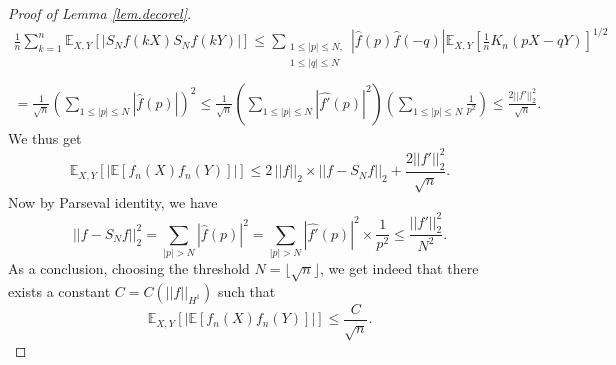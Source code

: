 \documentclass[10pt,a4paper]{amsart}
\begin{document}
\begin{proof}[Proof of Lemma \ref{lem.decorel}]
\[
\begin{array}{l}
\displaystyle{\frac{1}{n}\sum_{k=1}^{n} \mathbb E_{X,Y}\left[|S_N f(kX) S_N f(kY)|\right]}  \displaystyle{\leq \sum_{\substack{1\leq |p|\leq N, \\ 1\leq |q|\leq N}}|\widehat{f}(p)\widehat{f}(-q)|\mathbb E_{X,Y}\left[\frac{1}{n}K_n(pX-qY)\right]^{1/2}}\\
\\
 =\displaystyle{ \frac{1}{\sqrt{n}} \left( \sum_{1\leq |p|\leq N}|\widehat{f}(p)|\right)^2 \leq \frac{1}{\sqrt{n}} \left( \sum_{1\leq |p|\leq N}|\widehat{f'}(p)|^2\right)\left( \sum_{1\leq |p|\leq N}\frac{1}{p^2}\right)\leq \frac{2 ||f'||_2^2}{\sqrt{n}}}.
\end{array}
\]
We thus get 
\[
\mathbb E_{X,Y} \left[ \left|\mathbb E[f_n(X)f_n(Y)] \right|\right] \leq 2\, ||f||_2 \times ||f-S_Nf ||_2 + \frac{2 ||f'||_2^2}{\sqrt{n}}.
\]
Now by Parseval identity, we have 
\[
||f-S_Nf ||_2^2 = \sum_{|p|>N}|\widehat{f}(p)|^2 =  \sum_{|p|>N}|\widehat{f'}(p)|^2 \times \frac{1}{p^2} \leq \frac{||f'||_2^2}{N^2}.
\]
As a conclusion, choosing the threshold $N=\lfloor\sqrt{n}\rfloor$, we get indeed that there exists a constant $C=C(||f||_{H^1})$ such that 
\[
\mathbb E_{X,Y} \left[ \left|\mathbb E[f_n(X)f_n(Y)] \right|\right]\leq \frac{C}{\sqrt{n}}.
\]
\end{proof}
\end{document}
